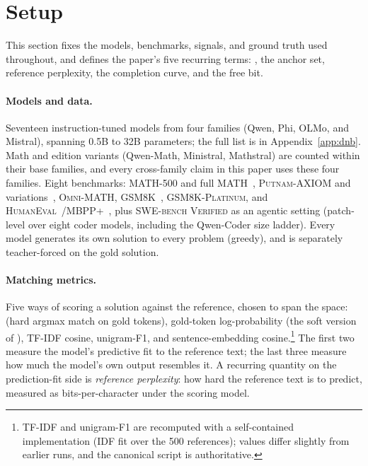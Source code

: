 \section{Setup}
\label{sec:setup}

This section fixes the models, benchmarks, signals, and ground truth used throughout, and defines the paper's five recurring terms: \tfa, the anchor set, reference perplexity, the completion curve, and the free bit.

\paragraph{Models and data.}
Seventeen instruction-tuned models from four families (Qwen, Phi, OLMo, and Mistral), spanning 0.5B to 32B parameters; the full list is in Appendix~\ref{app:dnb}.
Math and edition variants (Qwen-Math, Ministral, Mathstral) are counted within their base families, and every cross-family claim in this paper uses these four families.
Eight benchmarks: \textsc{MATH-500} and full \textsc{MATH}~\cite{hendrycks2021math}, \textsc{Putnam-AXIOM} and variations~\cite{gulati2025putnam}, \textsc{Omni-MATH}, \textsc{GSM8K}~\cite{cobbe2021gsm8k}, \textsc{GSM8K-Platinum}, and \textsc{HumanEval}~\cite{chen2021codex}/\textsc{MBPP+}~\cite{austin2021mbpp,liu2023evalplus}, plus \textsc{SWE-bench Verified} as an agentic setting (patch-level \tfa{} over eight coder models, including the Qwen-Coder size ladder).
Every model generates its own solution to every problem (greedy), and is separately teacher-forced on the gold solution.

\paragraph{Matching metrics.}
Five ways of scoring a solution against the reference, chosen to span the space: \tfa{} (hard argmax match on gold tokens), gold-token log-probability (the soft version of \tfa), TF-IDF cosine, unigram-F1, and sentence-embedding cosine.\footnote{TF-IDF and unigram-F1 are recomputed with a self-contained implementation (IDF fit over the 500 references); values differ slightly from earlier runs, and the canonical script is authoritative.}
The first two measure the model's predictive fit to the reference text; the last three measure how much the model's own output resembles it.
A recurring quantity on the prediction-fit side is \emph{reference perplexity}: how hard the reference text is to predict, measured as bits-per-character under the scoring model.

